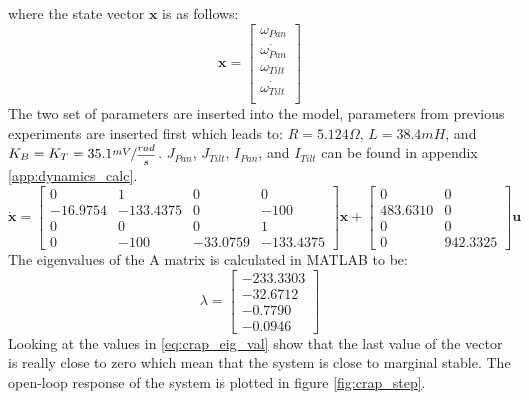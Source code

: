 where the state vector $\textbf{x}$ is as follows:
\[
 \textbf{x} =
 \begin{bmatrix}
   \omega_{Pan}\\
   \dot{\omega_{Pan}}\\
   \omega_{Tilt}\\
   \dot{\omega_{Tilt}}\\
 \end{bmatrix}
\]
The two set of parameters are inserted into the model, parameters from previous experiments are inserted first which leads to: $R = 5.124\Omega$, $L = 38.4mH$, and $K_B = K_T = 35.1 \sfrac{mV}{\dfrac{rad}{s}}$. $J_{Pan}$, $J_{Tilt}$, $I_{Pan}$, and $I_{Tilt}$ can be found in appendix \ref{app:dynamics_calc}.
\begin{equation}
 \dot{\textbf{x}} =
 \begin{bmatrix}
   0 & 1 & 0 & 0\\
   - 16.9754 & - 133.4375 & 0 & - 100\\
   0 & 0 & 0 & 1\\
   0 & - 100 & - 33.0759 & - 133.4375
 \end{bmatrix}
 \textbf{x} +
 \begin{bmatrix}
   0 & 0\\
   483.6310 & 0\\
   0 & 0\\
   0 & 942.3325
 \end{bmatrix}
 \textbf{u}\label{eq:crap_ss_model}
\end{equation}
The eigenvalues of the A matrix is calculated in MATLAB to be:
\begin{equation}
 \lambda =
 \begin{bmatrix}
   - 233.3303\\
   - 32.6712\\
   - 0.7790\\
   - 0.0946
 \end{bmatrix}\label{eq:crap_eig_val}
\end{equation}
Looking at the values in \ref{eq:crap_eig_val} show that the last value of the vector is really close to zero which mean that the system is close to marginal stable. The open-loop response of the system is plotted in figure \ref{fig:crap_step}.
